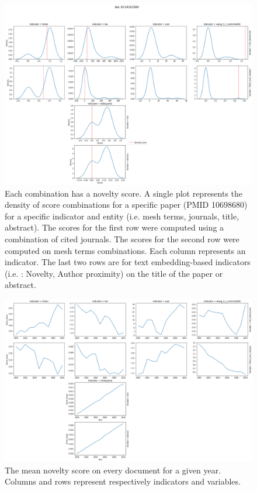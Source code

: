 \begin{figure}[H]
  \centering
  \includegraphics[scale=0.32]{3_chapter3/figures/density_score.png}
\caption[Distribution of novelty indicators for PMID 10698680]{\justifying Each combination has a novelty score. A single plot represents the density of score combinations for a specific paper (PMID 10698680) for a specific indicator and entity (i.e. mesh terms, journals, title, abstract). The scores for the first row were computed using a combination of cited journals. The scores for the second row were computed on mesh terms combinations. Each column represents an indicator. The last two rows are for text embedding-based indicators (i.e. \cite{shibayama2021measuring}: Novelty, Author proximity) on the title of the paper or abstract.}
\label{fig:11}
\end{figure}

\begin{figure}[H]
  \centering
  \includegraphics[scale=0.32]{3_chapter3/figures/trend_complex.png}
\caption[Novelty evolution over time]{\justifying The mean novelty score on every document for a given year. Columns and rows represent respectively indicators and variables.}
\label{fig:12}
\end{figure}

